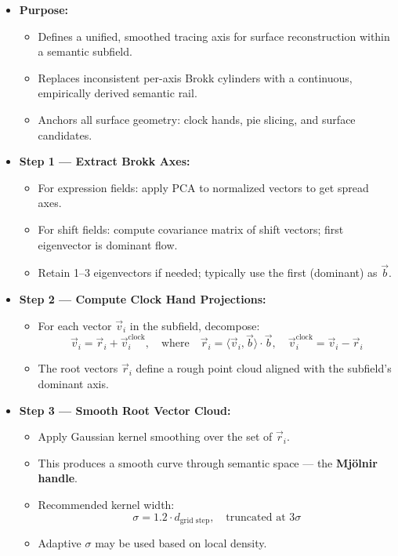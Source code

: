 \documentclass{article}
\begin{document}
\begin{itemize}
  \item \textbf{Purpose:}
    \begin{itemize}
      \item Defines a unified, smoothed tracing axis for surface reconstruction within a semantic subfield.
      \item Replaces inconsistent per-axis Brokk cylinders with a continuous, empirically derived semantic rail.
      \item Anchors all surface geometry: clock hands, pie slicing, and surface candidates.
    \end{itemize}

  \item \textbf{Step 1 — Extract Brokk Axes:}
    \begin{itemize}
      \item For expression fields: apply PCA to normalized vectors to get spread axes.
      \item For shift fields: compute covariance matrix of shift vectors; first eigenvector is dominant flow.
      \item Retain 1–3 eigenvectors if needed; typically use the first (dominant) as $\vec{b}$.
    \end{itemize}

  \item \textbf{Step 2 — Compute Clock Hand Projections:}
    \begin{itemize}
      \item For each vector $\vec{v}_i$ in the subfield, decompose:
        \[
        \vec{v}_i = \vec{r}_i + \vec{v}_i^{\text{clock}}, \quad \text{where} \quad
        \vec{r}_i = \langle \vec{v}_i, \vec{b} \rangle \cdot \vec{b}, \quad
        \vec{v}_i^{\text{clock}} = \vec{v}_i - \vec{r}_i
        \]
      \item The root vectors $\vec{r}_i$ define a rough point cloud aligned with the subfield's dominant axis.
    \end{itemize}

  \item \textbf{Step 3 — Smooth Root Vector Cloud:}
    \begin{itemize}
      \item Apply Gaussian kernel smoothing over the set of $\vec{r}_i$.
      \item This produces a smooth curve through semantic space — the \textbf{Mjölnir handle}.
      \item Recommended kernel width:
        \[
        \sigma = 1.2 \cdot d_{\text{grid step}}, \quad \text{truncated at } 3\sigma
        \]
      \item Adaptive $\sigma$ may be used based on local density.
    \end{itemize}


\end{itemize}
\end{document}
